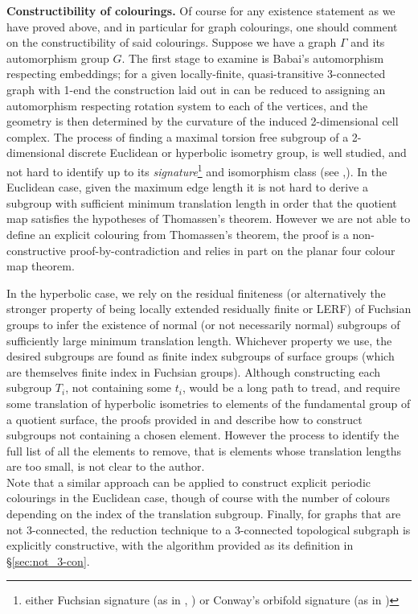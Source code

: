 \documentclass{article}
\numberwithin{equation}{section}
\theoremstyle{definition}
\theoremstyle{remark}
\begin{document}
\textbf{Constructibility of colourings.} Of course for any existence statement as we have proved above, and in particular for graph colourings, one should comment on the constructibility of said colourings. Suppose we have a graph $\Gamma$ and its automorphism group $G$. The first stage to examine is Babai's automorphism respecting embeddings; for a given locally-finite, quasi-transitive 3-connected graph with 1-end the construction laid out in \cite{Babai97} can be reduced to assigning an automorphism respecting rotation system to each of the vertices, and the geometry is then determined by the curvature of the induced 2-dimensional cell complex. The process of finding a maximal torsion free subgroup of a 2-dimensional discrete Euclidean or hyperbolic isometry group, is well studied, and not hard to identify up to its \textit{signature}\footnote{either Fuchsian signature (as in \cite{Singerman1970}, \cite{Fuchsian_Katok}) or Conway's orbifold signature (as in \cite{conway2008symmetries})} and isomorphism class (see \cite{Edmonds1982},\cite{Schattschneider}). 
In the Euclidean case, given the maximum edge length it is not hard to derive a subgroup with sufficient minimum translation length in order that the quotient map satisfies the hypotheses of Thomassen's theorem. However we are not able to define an explicit colouring from Thomassen's theorem, the proof is a non-constructive proof-by-contradiction and relies in part on the planar four colour map theorem.

In the hyperbolic case, we rely on the residual finiteness (or alternatively the stronger property of being locally extended residually finite or LERF) of Fuchsian groups to infer the existence of normal (or not necessarily normal) subgroups of sufficiently large minimum translation length. 
Whichever property we use, the desired subgroups are found as finite index subgroups of surface groups (which are themselves finite index in Fuchsian groups). Although constructing each subgroup $T_i$, not containing some $t_i$, would be a long path to tread, and require some translation of hyperbolic isometries to elements of the fundamental group of a quotient surface, the proofs provided in \cite{Hempel_72} and \cite{Lopez94} describe how to construct subgroups not containing a chosen element. 
However the process to identify the full list of all the elements to remove, that is elements whose translation lengths are too small, is not clear to the author. \\ 
Note that a similar approach can be applied to construct explicit periodic colourings in the Euclidean case, though of course with the number of colours depending on the index of the translation subgroup.
Finally, for graphs that are not 3-connected, the reduction technique to a 3-connected topological subgraph is explicitly constructive, with the algorithm provided as its definition in \S\ref{sec:not_3-con}.
\end{document}
